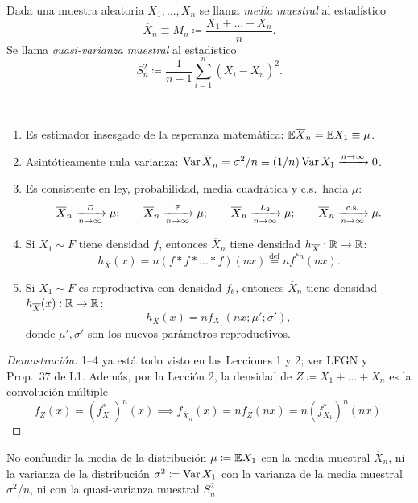 \begin{definicion}[8]
Dada una muestra aleatoria $X_1, \dots, X_n$ se llama \emph{media muestral} al estadístico
\[
  \overline{X}_n \equiv M_n \coloneqq \frac{X_1 + \dots + X_n}{n}.
\]
Se llama \emph{quasi-varianza muestral} al estadístico
\[
  S_n^2 \coloneqq \frac{1}{n-1}\sum_{i=1}^n (X_i - \overline{X}_n)^2.
\]
\end{definicion}

\begin{proposicion} \, 
\begin{enumerate}
  \item Es estimador insesgado de la esperanza matemática: $\mathbb{E}\overline{X}_n = \mathbb{E} X_1 \equiv \mu$.
  \item Asintóticamente nula varianza: $\operatorname{Var}\overline{X}_n = \sigma^2/n \equiv (1/n)\operatorname{Var} X_1 \xrightarrow{n\to\infty} 0$.
  \item Es consistente en ley, probabilidad, media cuadrática y c.s.\ hacia $\mu$:
        \[
          \overline{X}_n \xrightarrow[n\to\infty]{D} \mu; \qquad \overline{X}_n \xrightarrow[n\to\infty]{\mathbb{P}} \mu; \qquad \overline{X}_n \xrightarrow[n\to\infty]{L_2} \mu; \qquad \overline{X}_n \xrightarrow[n\to\infty]{\text{c.s.}} \mu.
        \]
  \item Si $X_1 \sim F$ tiene densidad $f$, entonces $\overline{X}_n$ tiene densidad $h_{\overline{X}} : \mathbb{R} \to \mathbb{R}$:
        \[
          h_{\overline{X}}(x) = n(f * f * \dots * f)(nx) \stackrel{\text{def}}{=} n f^{*n}(nx).
        \]
  \item Si $X_1 \sim F$ es reproductiva con densidad $f_\theta$, entonces $\overline{X}_n$ tiene densidad $h_{\overline{X}}(x) : \mathbb{R} \to \mathbb{R}$:
        \[
          h_{\overline{X}}(x) = n f_{X_1}(nx; \mu'; \sigma'),
        \]
        donde $\mu', \sigma'$ son los nuevos parámetros reproductivos.
\end{enumerate}
\end{proposicion}
\begin{proof}[Demostración]
1--4 ya está todo visto en las Lecciones 1 y 2; ver LFGN y Prop.\ 37 de L1. Además, por la Lección 2, la densidad de $Z \coloneqq X_1 + \dots + X_n$ es la convolución múltiple
\[
  f_Z(x) = (f_{X_1}^{*})^n(x) \implies f_{\overline{X}_n}(x) = n f_Z(nx) = n(f_{X_1}^{*})^n(nx).
\]
\end{proof}
\begin{observacion}[6]
No confundir la media de la distribución $\mu \coloneqq \mathbb{E} X_1$ con la media muestral $\overline{X}_n$, ni la varianza de la distribución $\sigma^2 \coloneqq \operatorname{Var} X_1$ con la varianza de la media muestral $\sigma^2/n$, ni con la quasi-varianza muestral $S_n^2$.
\end{observacion}

